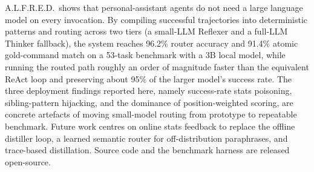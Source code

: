 A.L.F.R.E.D.\ shows that personal-assistant agents do not need a large language model on every invocation. By compiling successful trajectories into deterministic patterns and routing across two tiers (a small-LLM Reflexer and a full-LLM Thinker fallback), the system reaches 96.2\% router accuracy and 91.4\% atomic gold-command match on a 53-task benchmark with a 3B local model, while running the routed path roughly an order of magnitude faster than the equivalent ReAct loop and preserving about 95\% of the larger model's success rate. The three deployment findings reported here, namely success-rate stats poisoning, sibling-pattern hijacking, and the dominance of position-weighted scoring, are concrete artefacts of moving small-model routing from prototype to repeatable benchmark. Future work centres on online stats feedback to replace the offline distiller loop, a learned semantic router for off-distribution paraphrases, and trace-based distillation. Source code and the benchmark harness are released open-source.
